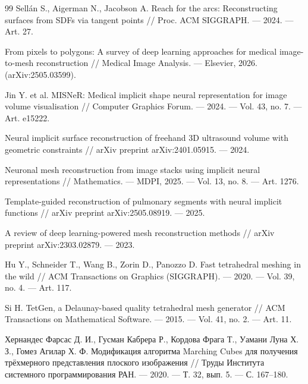 \documentclass[a4paper,14pt]{article}
\begin{document}
\begin{thebibliography}{99}
 Sell\'an S., Aigerman N., Jacobson A. Reach for the arcs: Reconstructing surfaces from SDFs via tangent points // Proc. ACM SIGGRAPH. --- 2024. --- Art. 27.

 From pixels to polygons: A survey of deep learning approaches for medical image-to-mesh reconstruction // Medical Image Analysis. --- Elsevier, 2026. (arXiv:2505.03599).

 Jin Y. et al. MISNeR: Medical implicit shape neural representation for image volume visualisation // Computer Graphics Forum. --- 2024. --- Vol. 43, no. 7. --- Art. e15222.

 Neural implicit surface reconstruction of freehand 3D ultrasound volume with geometric constraints // arXiv preprint arXiv:2401.05915. --- 2024.

 Neuronal mesh reconstruction from image stacks using implicit neural representations // Mathematics. --- MDPI, 2025. --- Vol. 13, no. 8. --- Art. 1276.

 Template-guided reconstruction of pulmonary segments with neural implicit functions // arXiv preprint arXiv:2505.08919. --- 2025.

 A review of deep learning-powered mesh reconstruction methods // arXiv preprint arXiv:2303.02879. --- 2023.

 Hu Y., Schneider T., Wang B., Zorin D., Panozzo D. Fast tetrahedral meshing in the wild // ACM Transactions on Graphics (SIGGRAPH). --- 2020. --- Vol. 39, no. 4. --- Art. 117.

 Si H. TetGen, a Delaunay-based quality tetrahedral mesh generator // ACM Transactions on Mathematical Software. --- 2015. --- Vol. 41, no. 2. --- Art. 11.

 Хернандес Фарсас Д. И., Гусман Кабрера Р., Кордова Фрага Т., Уамани Луна Х. З., Гомез Агилар Х. Ф. Модификация алгоритма Marching Cubes для получения трёхмерного представления плоского изображения // Труды Института системного программирования РАН. --- 2020. --- Т. 32, вып. 5. --- С. 167--180.

\end{thebibliography}
\end{document}
